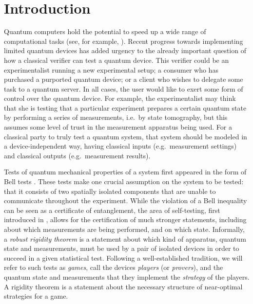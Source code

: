 \documentclass[11pt]{article}
\theoremstyle{remark}
\theoremstyle{definition}
\begin{document}


\clearpage

\tableofcontents

\clearpage


\section{Introduction}

Quantum computers hold the potential to speed up a wide range of computational tasks (see, for example, \cite{montanaro2016survey}). Recent progress towards implementing limited quantum devices has added urgency to the already important question of how a classical verifier can test a quantum device. This verifier could be an experimentalist running a new experimental setup; a consumer who has purchased a purported quantum device; or a client who wishes to delegate some task to a quantum server. In all cases, the user would like to exert some form of control over the quantum device. For example, the experimentalist may think that she is testing that a particular experiment prepares a certain quantum state by performing a series of measurements, i.e.\ by state tomography, but this assumes some level of trust in the measurement apparatus being used.  For a classical party to truly test a quantum system, that system should be modeled in a device-independent way, having classical inputs (e.g.\ measurement settings) and classical outputs (e.g.\ measurement results). 

Tests of quantum mechanical properties of a system first appeared in the form of Bell tests \cite{Bell:64a,Clauser:69a}. These tests make one crucial assumption on the system to be tested: that it consists of two spatially isolated components that %
are unable to communicate throughout the experiment. While the violation of a Bell inequality can be seen as a certificate of entanglement, the area of self-testing, first introduced in \cite{mayers2004selftesting}, allows for the certification of much stronger statements, including  about which measurements are being performed, and on which state.  Informally, a \emph{robust rigidity theorem} is a statement about which kind of apparatus, quantum state and measurements, must be used by a pair of isolated devices in order to succeed in a given statistical test. Following a well-established tradition, we will refer to such tests as \emph{games}, call the devices \emph{players} (or \emph{provers}), and the quantum state and measurements that they implement the \emph{strategy} of the players. A rigidity theorem is a statement about the necessary structure of near-optimal strategies for a game.  
\end{document}

